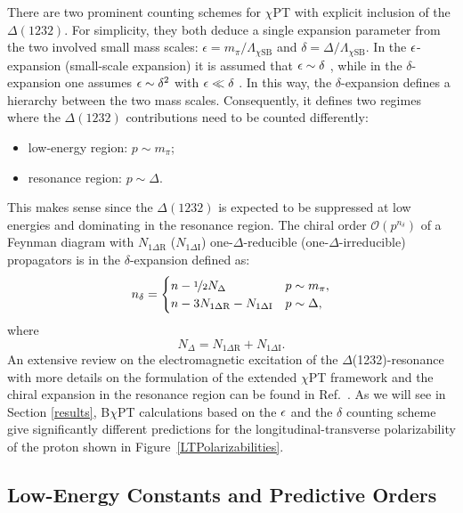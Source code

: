 \documentclass[preprints,review,accept,moreauthors,pdftex]{Definitions/mdpi}
\def\beq{\begin{equation}}
\def\eeq{\end{equation}}
\def\eqlab#1{\label{eq:#1}}
\def\de{\delta} \def\De{\Delta}
\begin{document}
There are two prominent counting schemes for $\chi$PT with explicit inclusion of the $\Delta(1232)$.
For simplicity, they both deduce a single expansion parameter from the two involved small mass scales: $\epsilon=m_\pi/\Lambda_{\chi\mathrm{SB}}$ and 
$\delta=\varDelta/\Lambda_{\chi\mathrm{SB}}$. In the $\epsilon$-expansion (small-scale expansion) it is assumed that $\epsilon \sim \delta$ \cite{Hemmert:1996xg}, while in the $\delta$-expansion one assumes $\epsilon \sim \delta^2$ with $\epsilon \ll \delta$ \cite{Pascalutsa:2003aa}. In this way, the $\delta$-expansion defines a hierarchy between the two mass scales. Consequently, it defines two regimes where the $\Delta(1232)$ contributions need to be counted differently:
\begin{itemize}[leftmargin=*,labelsep=5.8mm]
\item low-energy region: $p \sim m_\pi$;
\item resonance region: $p\sim \varDelta$.
\end{itemize}
This makes sense since the $\Delta(1232)$ is expected to be suppressed at low energies and dominating in the resonance region. The chiral order $\mathcal{O}(p^{n_\delta})$ of a Feynman diagram with $N_\text{1$\Delta$R}$ ($N_\text{1$\Delta$I}$)  one-$\Delta$-reducible (one-$\Delta$-irreducible) propagators is in the $\delta$-expansion defined as:
\beq
n_\delta=\begin{cases}n-\nicefrac{1}{2}N_\Delta&p\sim m_\pi,\\
n-3N_\text{1$\Delta$R}-N_\text{1$\Delta$I}&p\sim\Delta,\eqlab{deltacounting}
\end{cases}
\eeq
where
\beq
N_\Delta=N_\text{1$\Delta$R}+N_\text{1$\Delta$I}.
\eeq
An extensive review on the electromagnetic excitation of the $\Delta$(1232)-resonance with more details on the formulation of the extended $\chi$PT framework and the chiral expansion in the resonance region can be found in Ref.~\cite{Pascalutsa:2006up}. 
As we will see in Section \ref{results}, B$\chi$PT calculations based on the
$\epsilon$ \cite{Bernard:2012hb} and the
$\de$ \cite{Lensky:2014dda,Alarcon:2020icz} counting scheme give significantly different predictions for the longitudinal-transverse polarizability of the proton shown in Figure~\ref{LTPolarizabilities}.



\subsection{Low-Energy Constants and Predictive Orders} \label{LECsec}
\end{document}
